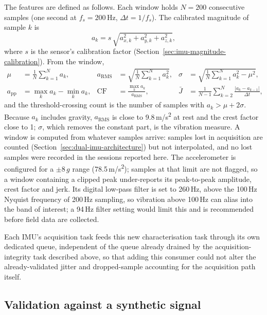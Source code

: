 The features are defined as follows. Each window holds $N = 200$ consecutive samples (one second at $f_s = 200$\,Hz, $\Delta t = 1/f_s$). The calibrated magnitude of sample $k$ is
\begin{equation}
a_k = s\,\sqrt{a_{x,k}^2 + a_{y,k}^2 + a_{z,k}^2},
\label{eq:magnitude}
\end{equation}
where $s$ is the sensor's calibration factor (Section~\ref{sec:imu-magnitude-calibration}). From the window,
\begin{align}
\mu &= \frac{1}{N}\sum_{k=1}^{N} a_k, &
a_{\mathrm{RMS}} &= \sqrt{\frac{1}{N}\sum_{k=1}^{N} a_k^2}, &
\sigma &= \sqrt{\frac{1}{N}\sum_{k=1}^{N} a_k^2 - \mu^2}, \label{eq:mean-rms-std}\\
a_{\mathrm{pp}} &= \max_k a_k - \min_k a_k, &
\mathrm{CF} &= \frac{\max_k a_k}{a_{\mathrm{RMS}}}, &
\bar{J} &= \frac{1}{N-1}\sum_{k=2}^{N} \frac{\lvert a_k - a_{k-1}\rvert}{\Delta t}, \label{eq:pp-cf-jerk}
\end{align}
and the threshold-crossing count is the number of samples with $a_k > \mu + 2\sigma$. Because $a_k$ includes gravity, $a_{\mathrm{RMS}}$ is close to 9.8\,m/s\textsuperscript{2} at rest and the crest factor close to 1; $\sigma$, which removes the constant part, is the vibration measure. A window is computed from whatever samples arrive: samples lost in acquisition are counted (Section~\ref{sec:dual-imu-architecture}) but not interpolated, and no lost samples were recorded in the sessions reported here. The accelerometer is configured for a $\pm 8\,g$ range (78.5\,m/s\textsuperscript{2}); samples at that limit are not flagged, so a window containing a clipped peak under-reports its peak-to-peak amplitude, crest factor and jerk. Its digital low-pass filter is set to 260\,Hz, above the 100\,Hz Nyquist frequency of 200\,Hz sampling, so vibration above 100\,Hz can alias into the band of interest; a 94\,Hz filter setting would limit this and is recommended before field data are collected.

Each IMU's acquisition task feeds this new characterisation task through its own dedicated queue, independent of the queue already drained by the acquisition-integrity task described above, so that adding this consumer could not alter the already-validated jitter and dropped-sample accounting for the acquisition path itself.

\subsection{Validation against a synthetic signal}

